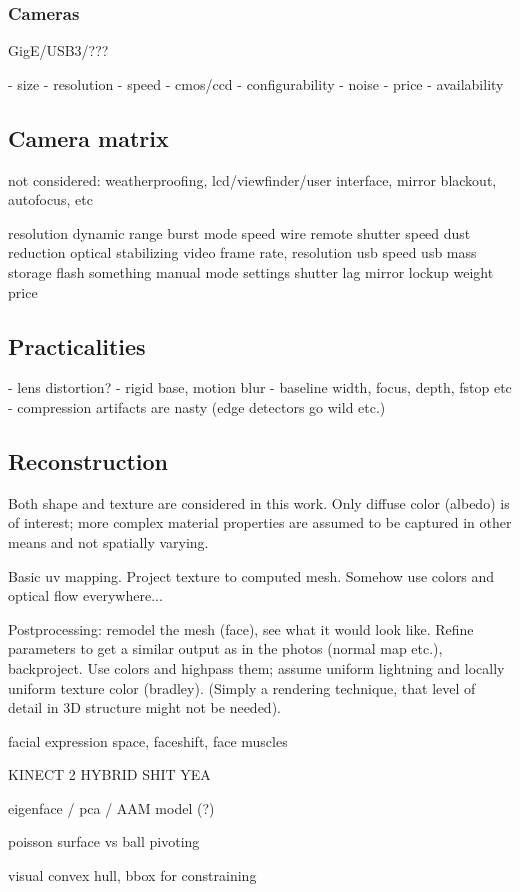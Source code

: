 \subsubsection{Cameras}

GigE/USB3/???

- size
- resolution
- speed
- cmos/ccd
- configurability
- noise
- price
- availability

\subsection{Camera matrix}

not considered: weatherproofing, lcd/viewfinder/user interface, mirror blackout, autofocus, etc

resolution
dynamic range
burst mode speed
wire remote shutter speed
dust reduction
optical stabilizing
video frame rate, resolution
usb speed
usb mass storage
flash something
manual mode settings
shutter lag
mirror lockup
weight
price

\subsection{Practicalities}

- lens distortion?
- rigid base, motion blur
- baseline width, focus, depth, fstop etc
- compression artifacts are nasty (edge detectors go wild etc.)


\subsection{Reconstruction}

Both shape and texture are considered in this work. Only diffuse color (albedo) is of interest; more complex material properties are assumed to be captured in other means and not spatially varying.

Basic uv mapping. Project texture to computed mesh. Somehow use colors and optical flow everywhere...

Postprocessing: remodel the mesh (face), see what it would look like. Refine parameters to get a similar output as in the photos (normal map etc.), backproject. Use colors and highpass them; assume uniform lightning and locally uniform texture color (bradley). (Simply a rendering technique, that level of detail in 3D structure might not be needed).

facial expression space, faceshift, face muscles

KINECT 2 HYBRID SHIT YEA

eigenface / pca / AAM model (?)

poisson surface vs ball pivoting

visual convex hull, bbox for constraining
